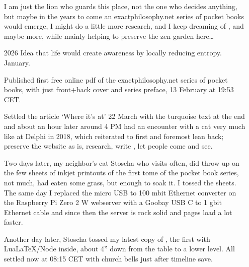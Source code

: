 \begin{itemize}
I am just the lion who guards this place,
not the one who decides anything,
but maybe in the years to come
an {\color{gray}exactphilosophy.net series} of pocket books would emerge,
I might do a little more research,
and I keep dreaming of \ELEMENTAL,
and maybe more,
while mainly helping to preserve the zen garden here…

\item[2026]
Idea that life would create awareness by locally reducing entropy.
%
January.

Published first free online pdf
of the {\color{gray}exactphilosophy.net series}
of pocket books, with just front+back cover and series preface,
13 February at 19:53 CET.

Settled the article ‘Where it’s at’ 22 March with the {\color{xphi}turquoise text} at the end
and about an hour later around 4 PM had an encounter with a cat very much like at Delphi in 2018,
which reiterated to first and foremost lean back;
preserve the website as is,
research,
write \ELEMENTAL,
let people come and see.

Two days later,
my neighbor’s cat Stoscha who visits often,
did throw up on the few sheets of inkjet printouts of the first tome of the pocket book series,
not much,
had eaten some grass,
but enough to soak it.
%
I tossed the sheets.
%
The same day I replaced the micro USB to 100 mbit Ethernet converter
on the Raspberry Pi Zero 2 W webserver
with a Goobay USB C to 1 gbit Ethernet cable
and since then the server is rock solid and pages load a lot faster.

Another day later,
Stoscha tossed my latest copy of \ELEMENTAL,
the first with LuaLaTeX/Node inside, about 4” down from the table to a lower level.
%
All settled now at 08:15 CET with church bells just after timeline save.

\end{itemize}
\normalsize

